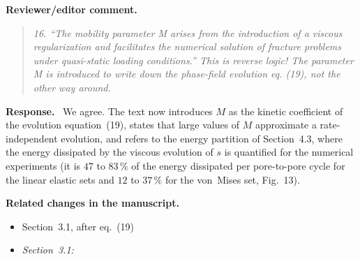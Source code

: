 \documentclass[pdflatex,sn-mathphys-num]{sn-jnl}
\newenvironment{reviewercomment}
  {\par\noindent\textbf{Reviewer/editor comment.}\begin{quote}\itshape}
  {\end{quote}}
\newenvironment{response}
  {\par\noindent\textbf{Response.}\ }
  {\par}
\newenvironment{relatedchanges}
  {\par\noindent\textbf{Related changes in the manuscript.}\begin{itemize}\small}
  {\end{itemize}}
\newcommand{\msloc}[1]{\textit{#1:}\ }
\newcommand{\relhead}[1]{\item[]\vspace*{0.2\baselineskip}#1}
\begin{document}
\begin{reviewercomment}
16. ``The mobility parameter M arises from the introduction of a viscous regularization and facilitates the numerical
solution of fracture problems under quasi-static loading conditions.'' This is reverse logic! The parameter M is
introduced to write down the phase-field evolution eq. (19), not the other way around.
\end{reviewercomment}
\begin{response}
We agree. The text now introduces $M$ as the kinetic coefficient of the evolution equation~(19), states that large values of $M$ approximate a rate-independent evolution, and refers to the energy partition of Section~4.3, where the energy dissipated by the viscous evolution of $s$ is quantified for the numerical experiments (it is $47$ to $83\,\%$ of the energy dissipated per pore-to-pore cycle for the linear elastic sets and $12$ to $37\,\%$ for the von~Mises set, Fig.~13).
\end{response}
\begin{relatedchanges}
\relhead{Section~3.1, after eq.~(19)}
\item \msloc{Section~3.1}
\end{relatedchanges}
\end{document}
